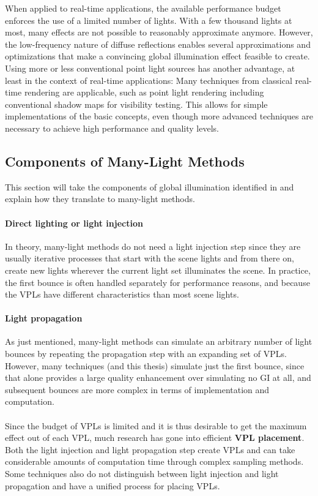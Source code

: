 When applied to real-time applications, the available performance budget enforces the use of a limited number of lights. With a few thousand lights at most, many effects are not possible to reasonably approximate anymore. However, the low-frequency nature of diffuse reflections enables several approximations and optimizations that make a convincing global illumination effect feasible to create. Using more or less conventional point light sources has another advantage, at least in the context of real-time applications: Many techniques from classical real-time rendering are applicable, such as point light rendering including conventional shadow maps for visibility testing. This allows for simple implementations of the basic concepts, even though more advanced techniques are necessary to achieve high performance and quality levels.



\subsection{Components of Many-Light Methods}
This section will take the components of global illumination identified in  and explain how they translate to many-light methods.

\paragraph{Direct lighting or light injection}
In theory, many-light methods do not need a light injection step since they are usually iterative processes that start with the scene lights and from there on, create new lights wherever the current light set illuminates the scene. In practice, the first bounce is often handled separately for performance reasons, and because the VPLs have different characteristics than most scene lights.

\paragraph{Light propagation}
As just mentioned, many-light methods can simulate an arbitrary number of light bounces by repeating the propagation step with an expanding set of VPLs. However, many techniques (and this thesis) simulate just the first bounce, since that alone provides a large quality enhancement over simulating no GI at all, and subsequent bounces are more complex in terms of implementation and computation.
\\
\\
Since the budget of VPLs is limited and it is thus desirable to get the maximum effect out of each VPL, much research has gone into efficient \textbf{VPL placement}. Both the light injection and light propagation step create VPLs and can take considerable amounts of computation time through complex sampling methods. Some techniques also do not distinguish between light injection and light propagation and have a unified process for placing VPLs.

